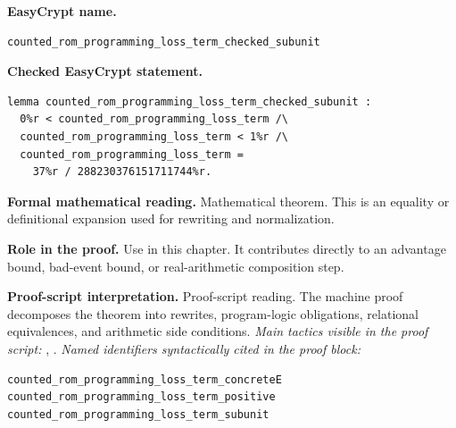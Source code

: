 \begin{formaltheorem}
\noindent\textbf{EasyCrypt name.}
\begin{lstlisting}[language=EasyCrypt,basicstyle=\ttfamily\scriptsize]
counted_rom_programming_loss_term_checked_subunit
\end{lstlisting}
\noindent\textbf{Checked EasyCrypt statement.}
\begin{lstlisting}[language=EasyCrypt,basicstyle=\ttfamily\scriptsize]
lemma counted_rom_programming_loss_term_checked_subunit :
  0%r < counted_rom_programming_loss_term /\
  counted_rom_programming_loss_term < 1%r /\
  counted_rom_programming_loss_term =
    37%r / 288230376151711744%r.
\end{lstlisting}
\noindent\textbf{Formal mathematical reading.}
Mathematical theorem. This is an equality or definitional expansion used for rewriting and normalization.

\noindent\textbf{Role in the proof.}
Use in this chapter. It contributes directly to an advantage bound, bad-event bound, or real-arithmetic composition step.

\noindent\textbf{Proof-script interpretation.}
Proof-script reading. The machine proof decomposes the theorem into rewrites, program-logic obligations, relational equivalences, and arithmetic side conditions.
\emph{Main tactics visible in the proof script:} , .
\emph{Named identifiers syntactically cited in the proof block:}
\begin{lstlisting}[language=EasyCrypt,basicstyle=\ttfamily\scriptsize]
counted_rom_programming_loss_term_concreteE
counted_rom_programming_loss_term_positive
counted_rom_programming_loss_term_subunit
\end{lstlisting}

\end{formaltheorem}

